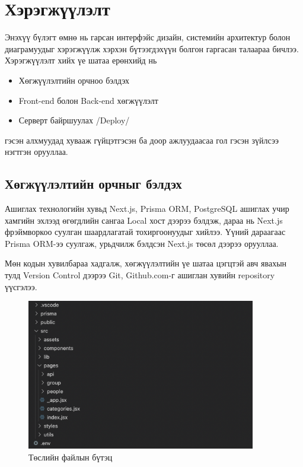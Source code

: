 \chapter{Хэрэгжүүлэлт}

Энэхүү бүлэгт өмнө нь гарсан интерфэйс дизайн, системийн архитектур болон диаграмуудыг хэрэгжүүлж хэрхэн бүтээгдэхүүн болгон гаргасан талаараа бичлээ. Хэрэгжүүлэлт хийх үе шатаа ерөнхийд нь

\begin{itemize}
	\item Хөгжүүлэлтийн орчноо бэлдэх
	\item Front-end болон Back-end хөгжүүлэлт
	\item Серверт байршуулах /Deploy/
\end{itemize}

гэсэн алхмуудад хувааж гүйцэтгэсэн ба доор ажлуудаасаа гол гэсэн зүйлсээ нэгтгэн орууллаа.

\section{Хөгжүүлэлтийн орчныг бэлдэх}
\label{section:backend}

Ашиглах технологийн хувьд Next.js, Prisma ORM, PostgreSQL ашиглах учир хамгийн эхлээд өгөгдлийн сангаа Local хост дээрээ бэлдэж, дараа нь Next.js фрэймворкоо суулган шаардлагатай тохиргоонуудыг хийлээ. Үүний дараагаас Prisma ORM-ээ суулгаж, урьдчилж бэлдсэн Next.js төсөл дээрээ орууллаа. 

Мөн кодын хувилбараа хадгалж, хөгжүүлэлтийн үе шатаа цэгцтэй авч явахын тулд  Version Control дээрээ Git, Github.com-г ашиглан хувийн repository үүсгэлээ. 

\clearpage
\begin{figure}[h]
	\centering
	\includegraphics[width=10cm]{images/implement/file-structure.png}
	\caption{Төслийн файлын бүтэц}
	\label{fig:file-structure}
\end{figure}

